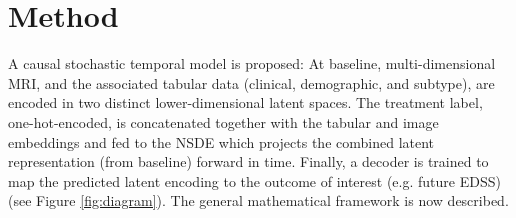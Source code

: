 \documentclass[runningheads]{llncs}
\begin{document}





\section{Method}
\label{sec:method}
A causal stochastic temporal model is proposed: At baseline, multi-dimensional MRI, and the associated tabular data (clinical, demographic, and subtype), are encoded in two distinct lower-dimensional latent spaces. The treatment label, one-hot-encoded, is concatenated together with the tabular and image embeddings and fed to the NSDE which projects the combined latent representation (from baseline) forward in time. Finally, a decoder is trained to map the predicted latent encoding to the outcome of interest (e.g. future EDSS) (see Figure \ref{fig:diagram}). The general mathematical framework is now described.
\end{document}
